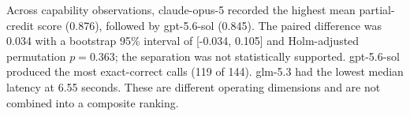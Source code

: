 Across capability observations, claude-opus-5 recorded the highest mean partial-credit score (0.876), followed by gpt-5.6-sol (0.845). The paired difference was 0.034 with a bootstrap 95\% interval of [-0.034, 0.105] and Holm-adjusted permutation $p=0.363$; the separation was not statistically supported.
gpt-5.6-sol produced the most exact-correct calls (119 of 144). glm-5.3 had the lowest median latency at 6.55 seconds. These are different operating dimensions and are not combined into a composite ranking.
